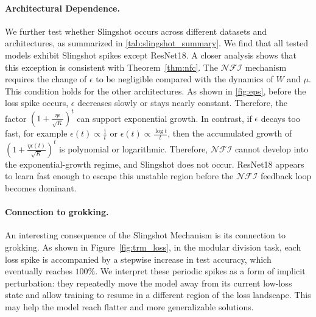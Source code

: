 \documentclass{article}
\theoremstyle{plain}
\theoremstyle{definition}
\theoremstyle{remark}
\begin{document}
\paragraph{Architectural Dependence.}
We further test whether Slingshot occurs across different datasets and architectures, as summarized in \cref{tab:slingshot_summary}. 
We find that all tested models exhibit Slingshot spikes except ResNet18. 
A closer analysis shows that this exception is consistent with Theorem~\ref{thm:nfc}. 
The $\mathcal{NFI}$ mechanism requires the change of $\epsilon$ to be negligible compared with the dynamics of $W$ and $\mu$. 
This condition holds for the other architectures. 
As shown in \cref{fig:eps}, before the loss spike occurs, $\epsilon$ decreases slowly or stays nearly constant. 
Therefore, the factor $(1+\frac{\eta\epsilon}{\sqrt{K}})^t$ can support exponential growth.
In contrast, if $\epsilon$ decays too fast, for example $\epsilon(t) \propto \frac{1}{t}$ or 
$\epsilon(t) \propto \frac{\log t}{t}$, 
then the accumulated growth of $(1+\frac{\eta\epsilon(t)}{\sqrt{K}})^t$ is polynomial or logarithmic. 
Therefore, $\mathcal{NFI}$ cannot develop into the exponential-growth regime, and Slingshot does not occur. 
ResNet18 appears to learn fast enough to escape this unstable region before the $\mathcal{NFI}$ feedback loop becomes dominant.

\paragraph{Connection to grokking.}
An interesting consequence of the Slingshot Mechanism is its connection to grokking. 
As shown in Figure~\ref{fig:trm_loss}, in the modular division task, each loss spike is accompanied by 
a stepwise increase in test accuracy, which eventually reaches $100\%$. 
We interpret these periodic spikes as a form of implicit perturbation: 
they repeatedly move the model away from its current low-loss state and allow training to resume in 
a different region of the loss landscape. 
This may help the model reach flatter and more generalizable solutions.
\end{document}
